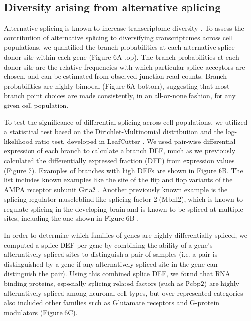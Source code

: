 \subsection{Diversity arising from alternative splicing}

Alternative splicing is known to increase transcriptome diversity \citep{ Andreadis_1987}. To assess the contribution of alternative splicing to diversifying transcriptomes across cell populations, we quantified the branch probabilities at each alternative splice donor site within each gene (Figure 6A top). The branch probabilities at each donor site are the relative frequencies with which particular splice acceptors are chosen, and can be estimated from observed junction read counts. Branch probabilities are highly bimodal (Figure 6A bottom), suggesting that most branch point choices are made consistently, in an all-or-none fashion, for any given cell population.

To test the significance of differential splicing across cell populations, we utilized a statistical test based on the Dirichlet-Multinomial distribution and the log-likelihood ratio test, developed in LeafCutter \citep{Li_2016}. We used pair-wise differential expression of each branch to calculate a branch DEF, much as we previously calculated the differentially expressed fraction (DEF) from expression values (Figure 3). Examples of branches with high DEFs are shown in Figure 6B. The list includes known examples like the site of the flip and flop variants of the AMPA receptor subunit Gria2 \cite{Sommer_1990}. Another previously known example is the splicing regulator muscleblind like splicing factor 2 (Mbnl2), which is known to regulate splicing in the developing brain  \cite{Charizanis_2012} and is known to be spliced at multiple sites, including the one shown in Figure 6B \cite{Pascual_2006}. 

In order to determine which families of genes are highly differentially spliced, we computed a splice DEF per gene by combining the ability of a gene’s alternatively spliced sites to distinguish a pair of samples (i.e. a pair is distinguished by a gene if any alternatively spliced site in the gene can distinguish the pair). Using this combined splice DEF, we found that RNA binding proteins, especially splicing related factors (such as Pcbp2) are highly alternatively spliced among neuronal cell types, but over-represented categories also included other families such as Glutamate receptors and G-protein modulators (Figure 6C). 


